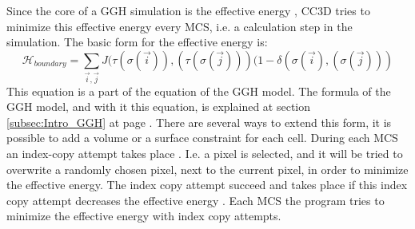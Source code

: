 Since the core of a \ac{GGH} simulation is the effective energy \cite{MaciejH.Swat2017}, \ac{CC3D} tries to minimize this effective energy every \ac{MCS}, i.e. a calculation step in the simulation. The basic form for the effective energy is:
\begin{equation}
\mathcal{H}_{boundary} = \sum_{\vec{i},\vec{j}}^{ }{J(\tau(\sigma(\vec{i})),(\tau(\sigma(\vec{j})))(1-\delta(\sigma(\vec{i}),(\sigma(\vec{j})))}
\end{equation}
This equation is a part of the equation of the \ac{GGH} model. The formula of the \ac{GGH} model, and with it this equation, is explained at section \ref{subsec:Intro_GGH} at page \pageref{subsec:Intro_GGH}. \newline
There are several ways to extend this form, it is possible to add a volume or a surface constraint for each cell. During each \ac{MCS} an index-copy attempt takes place \cite{MaciejH.Swat2017}. I.e. a pixel is selected, and it will be tried to overwrite a randomly chosen pixel, next to the current pixel, in order to minimize the effective energy. The index copy attempt succeed and takes place if this index copy attempt decreases the effective energy \cite{MaciejH.Swat2017}. Each \ac{MCS} the program tries to minimize the effective energy with index copy attempts.


